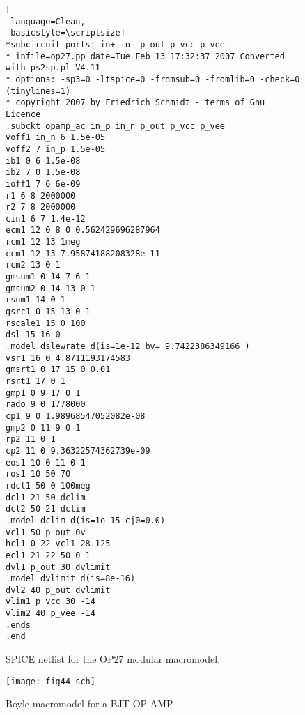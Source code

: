 \begin{figure} 
\begin{lstlisting}[
 language=Clean, 
 basicstyle=\scriptsize]
*subcircuit ports: in+ in- p_out p_vcc p_vee
* infile=op27.pp date=Tue Feb 13 17:32:37 2007 Converted with ps2sp.pl V4.11
* options: -sp3=0 -ltspice=0 -fromsub=0 -fromlib=0 -check=0 (tinylines=1)
* copyright 2007 by Friedrich Schmidt - terms of Gnu Licence
.subckt opamp_ac in_p in_n p_out p_vcc p_vee
voff1 in_n 6 1.5e-05
voff2 7 in_p 1.5e-05
ib1 0 6 1.5e-08
ib2 7 0 1.5e-08
ioff1 7 6 6e-09
r1 6 8 2000000
r2 7 8 2000000
cin1 6 7 1.4e-12
ecm1 12 0 8 0 0.562429696287964
rcm1 12 13 1meg
ccm1 12 13 7.95874188208328e-11
rcm2 13 0 1
gmsum1 0 14 7 6 1
gmsum2 0 14 13 0 1
rsum1 14 0 1
gsrc1 0 15 13 0 1
rscale1 15 0 100
dsl 15 16 0
.model dslewrate d(is=1e-12 bv= 9.7422386349166 )
vsr1 16 0 4.8711193174583
gmsrt1 0 17 15 0 0.01
rsrt1 17 0 1
gmp1 0 9 17 0 1
rado 9 0 1778000
cp1 9 0 1.98968547052082e-08
gmp2 0 11 9 0 1
rp2 11 0 1
cp2 11 0 9.36322574362739e-09
eos1 10 0 11 0 1
ros1 10 50 70
rdcl1 50 0 100meg
dcl1 21 50 dclim
dcl2 50 21 dclim
.model dclim d(is=1e-15 cj0=0.0)
vcl1 50 p_out 0v
hcl1 0 22 vcl1 28.125
ecl1 21 22 50 0 1
dvl1 p_out 30 dvlimit
.model dvlimit d(is=8e-16)
dvl2 40 p_out dvlimit
vlim1 p_vcc 30 -14
vlim2 40 p_vee -14
.ends
.end
\end{lstlisting}
  \caption{SPICE netlist for the OP27 modular macromodel. }  
  \label{fig:opamp44}
\end{figure}


\begin{figure} 
  \centering
  \texttt{[image: fig44\_sch]}
  \caption{Boyle macromodel for a BJT OP AMP } 
  \label{fig:opamp45}
\end{figure}

